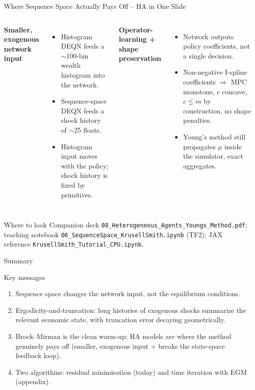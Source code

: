 \documentclass[aspectratio=169,11pt]{beamer}
\newcommand{\emphc}[1]{\textcolor{harvardcrimson}{#1}}
\begin{document}
\begin{frame}{Where Sequence Space Actually Pays Off -- HA in One Slide}
\small
\begin{columns}[T]
\textbf{Smaller, exogenous network input}
\begin{itemize}\itemsep2pt
    \item Histogram DEQN feeds a \emphc{$\sim$100-bin wealth histogram} into the network.
    \item Sequence-space DEQN feeds a \emphc{shock history of $\sim$25 floats}.
    \item Histogram input \emphc{moves with the policy}; shock history is fixed by primitives.
\end{itemize}

\textbf{Operator-learning + shape preservation}
\begin{itemize}\itemsep2pt
    \item Network outputs \emphc{policy coefficients}, not a single decision.
    \item Non-negative I-spline coefficients $\Rightarrow$ MPC monotone, $c$ concave, $c \le m$ \emphc{by construction}, no shape penalties.
    \item Young's method still propagates $\mu$ \emphc{inside the simulator}, exact aggregates.
\end{itemize}
\end{columns}

\vspace{0.3em}
\begin{block}{Where to look}
Companion deck \texttt{08\_Heterogeneous\_Agents\_Youngs\_Method.pdf}; teaching notebook \texttt{06\_SequenceSpace\_KrusellSmith.ipynb} (TF2); JAX reference \texttt{KrusellSmith\_Tutorial\_CPU.ipynb}.
\end{block}
\end{frame}


\begin{frame}{Summary}
\small
\begin{block}{Key messages}
\begin{enumerate}\itemsep4pt
    \item Sequence space changes the \emphc{network input}, not the equilibrium conditions.
    \item Ergodicity-and-truncation: long histories of exogenous shocks summarize the relevant economic state, with truncation error decaying geometrically.
    \item Brock--Mirman is the clean warm-up; HA models are where the method genuinely pays off (smaller, exogenous input + breaks the state-space feedback loop).
    \item Two algorithms: residual minimisation (today) and time iteration with EGM (appendix).
\end{enumerate}
\end{block}
\end{frame}
\end{document}
